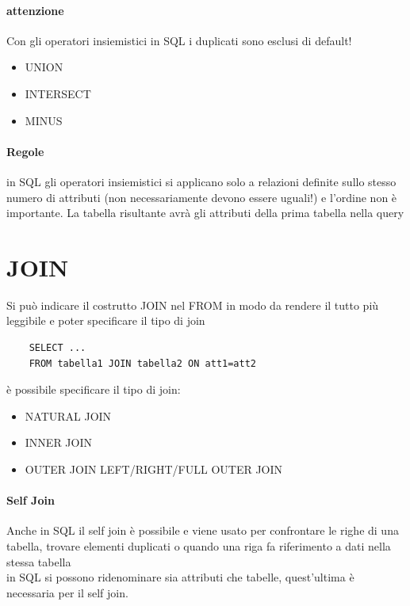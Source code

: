 \documentclass[12pt, a4paper, openany]{book}
\begin{document}
\paragraph{attenzione} 
Con gli operatori insiemistici in SQL i duplicati sono esclusi di default!

\begin{itemize}
    \item UNION
    \item INTERSECT
    \item MINUS
\end{itemize}

\paragraph{Regole}
in SQL gli operatori insiemistici si applicano solo a relazioni definite sullo stesso numero di attributi (non necessariamente devono essere uguali!) e l'ordine non è importante. La tabella risultante avrà gli attributi della prima tabella nella query

\section{JOIN}
Si può indicare il costrutto JOIN nel FROM in modo da rendere il tutto più leggibile e poter specificare il tipo di join
\begin{verbatim}
    SELECT ...
    FROM tabella1 JOIN tabella2 ON att1=att2
\end{verbatim}
è possibile specificare il tipo di join:
\begin{itemize}
    \item NATURAL JOIN
    \item INNER JOIN
    \item OUTER JOIN
    \subitem LEFT/RIGHT/FULL OUTER JOIN
\end{itemize}
\paragraph{Self Join} Anche in SQL il self join è possibile e viene usato per confrontare le righe di una tabella, trovare elementi duplicati o quando una riga fa riferimento a dati nella stessa tabella
\\in SQL si possono ridenominare sia attributi che tabelle, quest'ultima è necessaria per il self join.
\end{document}
